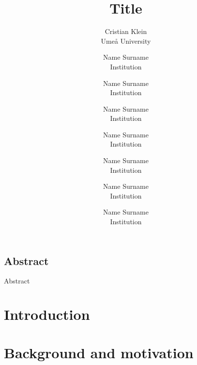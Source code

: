 \documentclass[letterpaper,twocolumn,10pt]{article}
\begin{document}
\date{}
\title{\Large \bf Title}

\author{
{\rm Cristian Klein}\\
Ume{\aa} University
\and
{\rm Name Surname}\\
Institution
\and
{\rm Name Surname}\\
Institution
\and
{\rm Name Surname}\\
Institution
\and
{\rm Name Surname}\\
Institution
\and
{\rm Name Surname}\\
Institution
\and
{\rm Name Surname}\\
Institution
\and
{\rm Name Surname}\\
Institution
} %

\maketitle



\subsection*{Abstract}
Abstract

\section{Introduction}
\label{sec:Introduction}


\section{Background and motivation}
\label{sec:ProblemStatement}


{\footnotesize 
}
\end{document}
